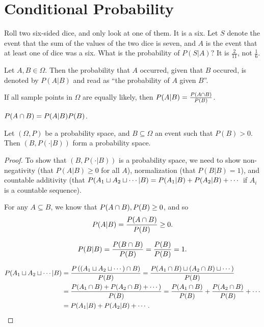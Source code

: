 \section{Conditional Probability}

\begin{exmp}
    Roll two six-sided dice, and only look at one of them. It is a six. Let $S$ denote the event that the sum of the values of the two dice is seven, and $A$ is the event that at least one of dice was a six. What is the probability of $P(S | A)?$ It is $\frac{2}{11}$, not $\frac{1}{6}$.
\end{exmp}

\begin{defn}
    Let $A, B \in \Omega$. Then the probability that $A$ occurred, given that $B$ occured, is denoted by $P(A | B)$ and read as ``the probability of $A$ given $B$''.
\end{defn}

\begin{prop}
    If all sample points in $\Omega$ are equally likely, then $P(A | B) = \frac{P(A \cap B)}{P(B)}$.
\end{prop}

\begin{cor}
    $P(A \cap B) = P(A | B)P(B)$.
\end{cor}

\begin{thm}
    Let $(\Omega, P)$ be a probability space, and $B \subseteq \Omega$ an event such that $P(B) > 0$. Then $(B, P(\cdot | B))$ form a probability space.
\end{thm}

\begin{proof}
    To show that $(B, P(\cdot|B))$ is a probability space, we need to show non-negativity (that $P(A | B) \geq 0$ for all $A$), normalization (that $P(B|B) = 1$), and countable additivity (that $P(A_1 \sqcup A_2 \sqcup \cdots | B) = P(A_1 | B) + P(A_2 | B) + \cdots$ if $A_i$ is a countable sequence).

    For any $A \subseteq B$, we know that $P(A \cap B), P(B) \geq 0$, and so \[P(A | B) = \frac{P(A \cap B)}{P(B)} \geq 0.\]

    \[P(B | B) = \frac{P(B \cap B)}{P(B)} = \frac{P(B)}{P(B)} = 1.\]

    \begin{align*}
        P(A_1 \sqcup A_2 \sqcup \cdots | B) &= \frac{P\left((A_1 \sqcup A_2 \sqcup \cdots) \cap B\right)}{P(B)} = \frac{P(A_1 \cap B) \sqcup (A_2 \cap B) \sqcup \cdots)}{P(B)} \\
        &= \frac{P(A_1 \cap B) + P(A_2 \cap B) + \cdots)}{P(B)} = \frac{P(A_1 \cap B)}{P(B)} + \frac{P(A_2 \cap B)}{P(B)} + \cdots \\
        &= P(A_1 | B) + P(A_2 | B) + \cdots.
    \end{align*}
\end{proof}

